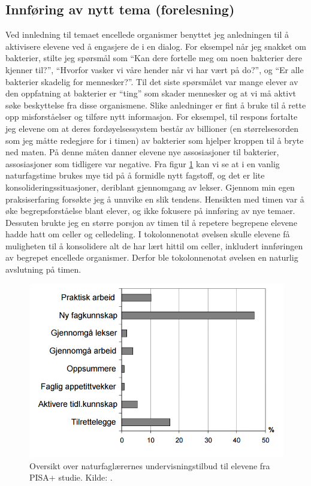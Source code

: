 \documentclass[main.tex]{subfiles}
\begin{document}
\subsection*{Innføring av nytt tema (forelesning)}
Ved innledning til temaet encellede organismer 
benyttet jeg anledningen til å aktivisere elevene ved å engasjere de i en dialog. For eksempel
når jeg snakket om bakterier, stilte jeg spørsmål som ``Kan dere fortelle meg om noen bakterier dere kjenner
til?'', ``Hvorfor vasker vi våre hender når vi har vært på do?'', og ``Er alle bakterier skadelig for mennesker?''.
Til det siste spørsmålet var mange elever av den oppfatning at bakterier er ``ting'' som skader mennesker og at vi
må aktivt søke beskyttelse fra disse organismene. Slike anledninger er fint å bruke til å rette opp 
misforståelser og tilføre nytt informasjon. For eksempel, til respons fortalte jeg elevene om at deres
fordøyelsessystem består av billioner (en størrelsesorden som jeg måtte redegjøre for i timen) av bakterier 
som hjelper kroppen til å bryte ned maten. På denne måten danner elevene nye assosiasjoner til bakterier,
assosiasjoner som tidligere var negative.
\newline
\newline
Fra figur \ref{fig:odeg10} kan vi se at i en vanlig naturfagstime brukes mye tid på å formidle 
nytt fagstoff, og det er lite konsolideringssituasjoner, deriblant gjennomgang av lekser. Gjennom
min egen praksiserfaring forsøkte jeg å unnvike en slik tendens. Hensikten med timen var å øke begrepsforståelse 
blant elever, og ikke fokusere på innføring av nye temaer. Dessuten brukte jeg en større porsjon 
av timen til å repetere begrepene elevene hadde hatt om celler og celledeling. I
tokolonnenotat øvelsen skulle elevene få muligheten til å konsolidere alt de har lært hittil
om celler, inkludert innføringen av begrepet encellede organismer. Derfor ble tokolonnenotat 
øvelsen en naturlig avslutning på timen.

\begin{figure}[h!]
\includegraphics[scale = 0.6]{../figures/undervisnings_aktivitet.png}
\caption{Oversikt over naturfaglærernes undervisningstilbud til elevene fra PISA+ studie. Kilde: 
\protect{}.}
\label{fig:odeg10}
\end{figure}
\end{document}
